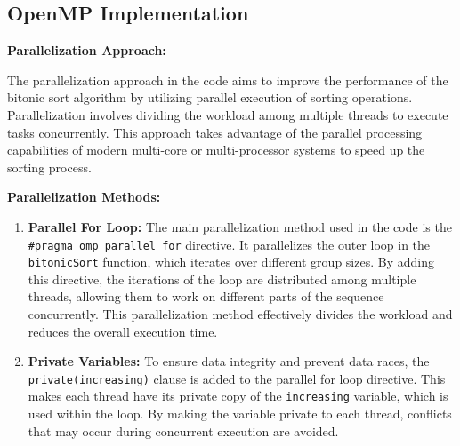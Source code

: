\newpage

\subsection{OpenMP Implementation}

\textbf{Parallelization Approach:}

The parallelization \cite{parallelalgorithms} approach in the code aims to improve the performance of the bitonic sort algorithm by utilizing parallel execution of sorting operations. Parallelization involves dividing the workload among multiple threads to execute tasks concurrently. This approach takes advantage of the parallel processing capabilities of modern multi-core or multi-processor systems to speed up the sorting process.

\textbf{Parallelization Methods:}

\begin{enumerate}
\item \textbf{Parallel For Loop:} The main parallelization method used in the code is the \lstinline|#pragma omp parallel for| directive. It parallelizes the outer loop in the \texttt{bitonicSort} function, which iterates over different group sizes. By adding this directive, the iterations of the loop are distributed among multiple threads, allowing them to work on different parts of the sequence concurrently. This parallelization method effectively divides the workload and reduces the overall execution time.

\item \textbf{Private Variables:} To ensure data integrity and prevent data races, the \texttt{private(increasing)} clause is added to the parallel for loop directive. This makes each thread have its private copy of the \texttt{increasing} variable, which is used within the loop. By making the variable private to each thread, conflicts that may occur during concurrent execution are avoided.
\end{enumerate}

